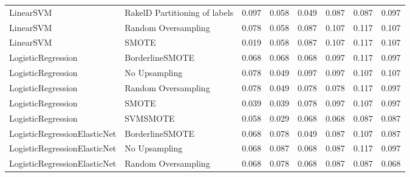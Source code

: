 \begin{tabular}{llllllll}
                      LinearSVM & RakelD Partitioning of labels & 0.097 &                     0.058 &                 0.049 &                  0.087 &                                   0.087 &    0.097 \\
                      LinearSVM &           Random Oversampling & 0.078 &                     0.058 &                 0.087 &                  0.107 &                                   0.117 &    0.107 \\
                      LinearSVM &                         SMOTE & 0.019 &                     0.058 &                 0.087 &                  0.107 &                                   0.117 &    0.107 \\
             LogisticRegression &               BorderlineSMOTE & 0.068 &                     0.068 &                 0.068 &                  0.097 &                                   0.117 &    0.097 \\
             LogisticRegression &                 No Upsampling & 0.078 &                     0.049 &                 0.097 &                  0.097 &                                   0.107 &    0.107 \\
             LogisticRegression &           Random Oversampling & 0.078 &                     0.049 &                 0.078 &                  0.078 &                                   0.117 &    0.097 \\
             LogisticRegression &                         SMOTE & 0.039 &                     0.039 &                 0.078 &                  0.097 &                                   0.107 &    0.097 \\
             LogisticRegression &                      SVMSMOTE & 0.058 &                     0.029 &                 0.068 &                  0.068 &                                   0.087 &    0.087 \\
   LogisticRegressionElasticNet &               BorderlineSMOTE & 0.068 &                     0.078 &                 0.049 &                  0.087 &                                   0.107 &    0.087 \\
   LogisticRegressionElasticNet &                 No Upsampling & 0.068 &                     0.087 &                 0.068 &                  0.087 &                                   0.117 &    0.097 \\
   LogisticRegressionElasticNet &           Random Oversampling & 0.068 &                     0.078 &                 0.068 &                  0.087 &                                   0.087 &    0.068 \\

\end{tabular}

